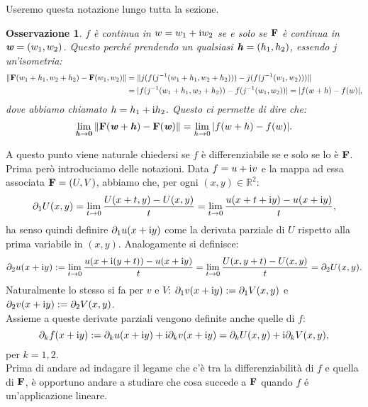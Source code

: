 \documentclass[11pt]{book}
\theoremstyle{Definizione}
\theoremstyle{TeoremaProposizioneLemmaCorollarioCongettura}
\theoremstyle{OsservazioneNotaEsempio}
\newtheorem{myobs}{Osservazione}[section]
\newcommand{\R}{\mathbb{R}}
\newcommand{\gro}[1]{\textbf{\textup{#1}}}
\newcommand{\gri}[1]{\textbf{\textit{{#1}}}}
\renewcommand{\i}{\textup{i}}
\begin{document}
Useremo questa notazione lungo tutta la sezione.
\begin{myobs}
$f$ è continua in $w = w_1+\i w_2$ se e solo se $\gro{F}$ è continua in $\gri{w} = (w_1,w_2)$. Questo perché prendendo un qualsiasi $\gri{h} = (h_1,h_2)$, essendo $j$ un'isometria:
\begin{align*}
\|\gro{F}(w_1+h_1,w_2+h_2) - \gro{F}(w_1,w_2)\| &= \|j(f(j^{-1}(w_1+h_1,w_2+h_2)))-j(f(j^{-1}(w_1,w_2)))\| \\
&= |f(j^{-1}(w_1+h_1,w_2+h_2))-f(j^{-1}(w_1,w_2))| = |f(w+h)-f(w)|,
\end{align*}
dove abbiamo chiamato $h = h_1+\i h_2$. Questo ci permette di dire che:
$$
\lim_{\gri{h}\to \gro{0}} \|\gro{F}(\gri{w}+\gri{h})-\gro{F}(\gri{w})\| = \lim_{h \to 0} |f(w+h)-f(w)|.
$$
\end{myobs}
A questo punto viene naturale chiedersi se $f$ è differenziabile se e solo se lo è $\gro{F}$.
Prima però introduciamo delle notazioni. Data $f = u+\i v$ e la mappa ad essa associata $\gro{F} = (U,V)$, abbiamo che, per ogni $(x,y)\in \R^2$:
$$
\partial_1 U(x,y) = \lim_{t \to 0} \frac{U(x+t,y)-U(x,y)}{t} = \lim_{t \to 0} \frac{u(x+t+\i y)-u(x+\i y)}{t},
$$
ha senso quindi definire $\partial_1 u (x+\i y)$ come la derivata parziale di $U$ rispetto alla prima variabile in $(x,y)$. Analogamente si definisce:
$$
\partial_2 u(x+\i y) := \lim_{t \to 0} \frac{u(x+\i(y+t))-u(x+\i y)}{t} = \lim_{t \to 0} \frac{U(x,y+t)-U(x,y)}{t} = \partial_2 U (x,y).
$$
Naturalmente lo stesso si fa per $v$ e $V$: $\partial_1 v(x+\i y):= \partial_1 V(x,y)$ e $\partial_2 v(x+\i y) := \partial_2 V(x,y)$.\\
Assieme a queste derivate parziali vengono definite anche quelle di $f$:
$$
\partial_k f (x+\i y) := \partial_k u(x+\i y)+\i \partial_k v(x+\i y) = \partial_k U(x,y) + \i \partial_k V(x,y),
$$
per $k = 1,2$.\\
Prima di andare ad indagare il legame che c'è tra la differenziabilità di $f$ e quella di $\gro{F}$, è opportuno andare a studiare che cosa succede a $\gro{F}$ quando $f$ é un'applicazione lineare.
\end{document}
